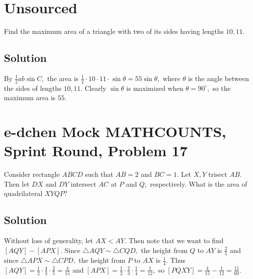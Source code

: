 \documentclass[blue,onecol]{shooting}
\begin{document}
\section{Unsourced}
Find the maximum area of a triangle with two of its sides having lengths $10,11.$

\subsection{Solution}
By $\frac{1}{2}ab\sin C,$ the area is $\frac{1}{2}\cdot 10\cdot 11\cdot \sin\theta=55\sin\theta,$ where $\theta$ is the angle between the sides of lengths $10,11.$ Clearly $\sin\theta$ is maximized when $\theta=90^{\circ},$ so the maximum area is $55.$

\section{e-dchen Mock MATHCOUNTS, Sprint Round, Problem 17}
Consider rectangle $ABCD$ such that $AB=2$ and $BC=1.$ Let $X,Y$ trisect $AB.$ Then let $DX$ and $DY$ intersect $AC$ at $P$ and $Q,$ respectively. What is the area of quadrilateral $XYQP?$

\subsection{Solution}
Without loss of generality, let $AX<AY.$ Then note that we want to find $[AQY]-[APX].$ Since $\triangle AQY\sim \triangle CQD,$ the height from $Q$ to $AY$ is $\frac{2}{5}$ and since $\triangle APX\sim \triangle CPD,$ the height from $P$ to $AX$ is $\frac{1}{4}.$ Thus $[AQY]=\frac{1}{2}\cdot\frac{4}{3}\cdot\frac{2}{5}=\frac{4}{15}$ and $[APX]=\frac{1}{2}\cdot\frac{2}{3}\cdot\frac{1}{4}=\frac{1}{12},$ so $[PQXY]=\frac{4}{15}-\frac{1}{12}=\frac{11}{60}.$

\begin{center}
\end{center}
\end{document}
